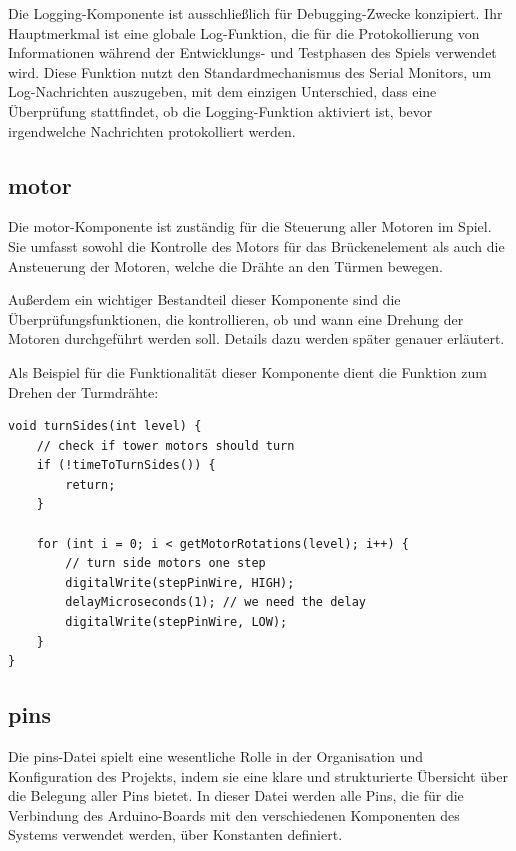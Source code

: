 Die Logging-Komponente ist ausschließlich für Debugging-Zwecke konzipiert. Ihr Hauptmerkmal ist eine globale Log-Funktion, die für die Protokollierung von Informationen während der Entwicklungs- und Testphasen des Spiels verwendet wird. Diese Funktion nutzt den Standardmechanismus des Serial Monitors, um Log-Nachrichten auszugeben, mit dem einzigen Unterschied, dass eine Überprüfung stattfindet, ob die Logging-Funktion aktiviert ist, bevor irgendwelche Nachrichten protokolliert werden.

\subsection{motor}

Die motor-Komponente ist zuständig für die Steuerung aller Motoren im Spiel. Sie umfasst sowohl die Kontrolle des Motors für das Brückenelement als auch die Ansteuerung der Motoren, welche die Drähte an den Türmen bewegen.

Außerdem ein wichtiger Bestandteil dieser Komponente sind die Überprüfungsfunktionen, die kontrollieren, ob und wann eine Drehung der Motoren durchgeführt werden soll. Details dazu werden später genauer erläutert.

Als Beispiel für die Funktionalität dieser Komponente dient die Funktion zum Drehen der Turmdrähte:

\begin{minipage}{\linewidth}
\begin{lstlisting}[caption={Code zum Drehen der Turmdrähte},captionpos=b]
void turnSides(int level) {
    // check if tower motors should turn
    if (!timeToTurnSides()) {
        return;
    }

    for (int i = 0; i < getMotorRotations(level); i++) {
        // turn side motors one step
        digitalWrite(stepPinWire, HIGH);
        delayMicroseconds(1); // we need the delay
        digitalWrite(stepPinWire, LOW);
    }
}
\end{lstlisting}
\end{minipage}  


\subsection{pins}
Die pins-Datei spielt eine wesentliche Rolle in der Organisation und Konfiguration des Projekts, indem sie eine klare und strukturierte Übersicht über die Belegung aller Pins bietet. In dieser Datei werden alle Pins, die für die Verbindung des Arduino-Boards mit den verschiedenen Komponenten des Systems verwendet werden, über Konstanten definiert.

